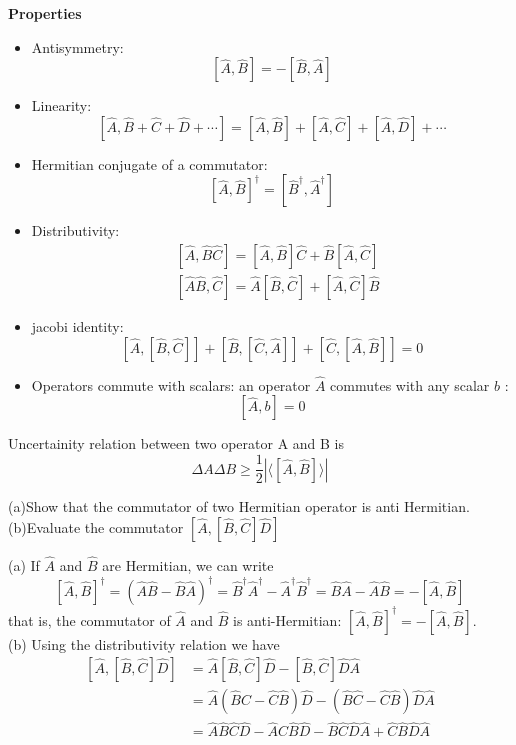 \textbf{Properties}\\
\begin{itemize}
	\item Antisymmetry:
	$$[\hat{A}, \hat{B}]=-[\hat{B}, \hat{A}]$$
	\item Linearity:
	 $$[\hat{A}, \hat{B}+\hat{C}+\hat{D}+\cdots]=[\hat{A}, \hat{B}]+[\hat{A}, \hat{C}]+[\hat{A}, \hat{D}]+\cdots$$
	 \item  Hermitian conjugate of a commutator: 
	 $$[\hat{A}, \hat{B}]^{\dagger}=\left[\hat{B}^{\dagger}, \hat{A}^{\dagger}\right]$$
	 \item  Distributivity: 
	 $$\begin{aligned}
	 	&{[\hat{A}, \hat{B} \hat{C}]=[\hat{A}, \hat{B}] \hat{C}+\hat{B}[\hat{A}, \hat{C}]} \\
	 	&{[\hat{A} \hat{B}, \hat{C}]=\hat{A}[\hat{B}, \hat{C}]+[\hat{A}, \hat{C}] \hat{B}}
	 \end{aligned}$$
	 \item jacobi identity:
	 $$[\hat{A},[\hat{B}, \hat{C}]]+[\hat{B},[\hat{C}, \hat{A}]]+[\hat{C},[\hat{A}, \hat{B}]]=0$$
	 \item Operators commute with scalars: an operator $\hat{A}$ commutes with any scalar $b$ :
	 $$
	 [\hat{A}, b]=0
	 $$
\end{itemize}
\begin{note}
	Uncertainity relation between two operator A  and B is \\
	$$\Delta A \Delta B \geq \frac{1}{2}\left| \langle \left[ \hat{A},\hat{B}\right] \rangle \right| $$
\end{note}
\begin{exercise}
	(a)Show that the commutator of two Hermitian operator is anti Hermitian.\\
	(b)Evaluate the commutator $\left[ \hat{A},\left[ \hat{B},\hat{C}\right] \hat{D}\right] $
\end{exercise}
\begin{answer}
	(a) If $\hat{A}$ and $\hat{B}$ are Hermitian, we can write
	$$
	[\hat{A}, \hat{B}]^{\dagger}=(\hat{A} \hat{B}-\hat{B} \hat{A})^{\dagger}=\hat{B}^{\dagger} \hat{A}^{\dagger}-\hat{A}^{\dagger} \hat{B}^{\dagger}=\hat{B} \hat{A}-\hat{A} \hat{B}=-[\hat{A}, \hat{B}] 
	$$
	that is, the commutator of $\hat{A}$ and $\hat{B}$ is anti-Hermitian: $[\hat{A}, \hat{B}]^{\dagger}=-[\hat{A}, \hat{B}]$.\\
	(b) Using the distributivity relation we have
	$$
	\begin{aligned}
	{[\hat{A},{[\hat{B},\hat{C}]}\hat{D}]} &=\hat{A}[\hat{B},\hat{C}]\hat{D}-[\hat{B},\hat{C}]\hat{D}\hat{A} \\
	&=\hat{A}(\hat{B} \hat{C}-\hat{C} \hat{B})\hat{D}-(\hat{B} \hat{C}-\hat{C} \hat{B})\hat{D} \hat{A}  \\
	&=\hat{A} \hat{B} \hat{C} \hat{D}-\hat{A} \hat{C} \hat{B} \hat{D}-\hat{B} \hat{C} \hat{D} \hat{A}+\hat{C} \hat{B} \hat{D} \hat{A}
	\end{aligned}
	$$
\end{answer}
